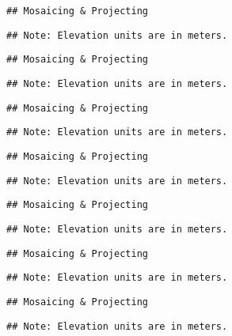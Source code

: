 \documentclass[
]{article}
\begin{document}
\begin{verbatim}
## Mosaicing & Projecting
\end{verbatim}

\begin{verbatim}
## Note: Elevation units are in meters.
\end{verbatim}

\begin{verbatim}
## Mosaicing & Projecting
\end{verbatim}

\begin{verbatim}
## Note: Elevation units are in meters.
\end{verbatim}

\begin{verbatim}
## Mosaicing & Projecting
\end{verbatim}

\begin{verbatim}
## Note: Elevation units are in meters.
\end{verbatim}

\begin{verbatim}
## Mosaicing & Projecting
\end{verbatim}

\begin{verbatim}
## Note: Elevation units are in meters.
\end{verbatim}

\begin{verbatim}
## Mosaicing & Projecting
\end{verbatim}

\begin{verbatim}
## Note: Elevation units are in meters.
\end{verbatim}

\begin{verbatim}
## Mosaicing & Projecting
\end{verbatim}

\begin{verbatim}
## Note: Elevation units are in meters.
\end{verbatim}

\begin{verbatim}
## Mosaicing & Projecting
\end{verbatim}

\begin{verbatim}
## Note: Elevation units are in meters.
\end{verbatim}
\end{document}
